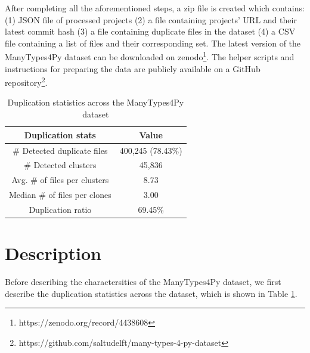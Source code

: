 \documentclass[10pt, conference]{IEEEtran}
\begin{document}
After completing all the aforementioned steps, a zip file is created which contains: (1) JSON file of processed projects (2) a file containing projects' URL and their latest commit hash (3) a file containing duplicate files in the dataset (4) a CSV file containing a list of files and their corresponding set. The latest version of the ManyTypes4Py dataset can be downloaded on zenodo\footnote{https://zenodo.org/record/4438608}. The helper scripts and instructions for preparing the data are publicly available on a GitHub repository\footnote{https://github.com/saltudelft/many-types-4-py-dataset}.

\begin{table}[!t]
	\centering
	\label{tab:dup-stats}
	\caption{Duplication statistics across the ManyTypes4Py dataset}
	\begin{tabular}{c c}
		\toprule
		Duplication stats & Value \\
		\midrule
		\# Detected duplicate files & 400,245 (78.43\%) \\
		\# Detected clusters & 45,836 \\
		Avg. \# of files per clusters & 8.73 \\
		Median \# of files per clones & 3.00 \\
		Duplication ratio & 69.45\% \\
		\bottomrule
	\end{tabular}
\end{table}

\section{Description}
Before describing the charactersitics of the ManyTypes4Py dataset, we first describe the duplication statistics across the dataset, which is shown in Table \ref{tab:dup-stats}.
\end{document}
